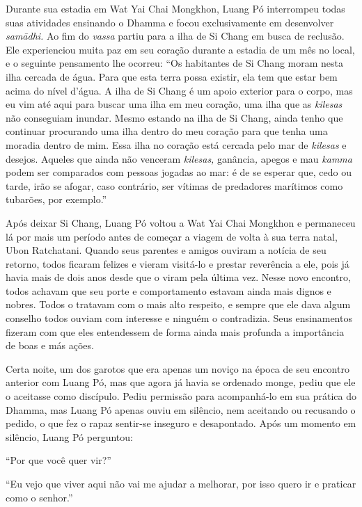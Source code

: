 Durante sua estadia em Wat Yai Chai Mongkhon, Luang Pó interrompeu todas
suas atividades ensinando o Dhamma e focou exclusivamente em desenvolver
\emph{samādhi.} Ao fim do \emph{vassa} partiu para a ilha de Si Chang em
busca de reclusão. Ele experienciou muita paz em seu coração durante a
estadia de um mês no local, e o seguinte pensamento lhe ocorreu: ``Os
habitantes de Si Chang moram nesta ilha cercada de água. Para que esta
terra possa existir, ela tem que estar bem acima do nível d'água. A ilha
de Si Chang é um apoio exterior para o corpo, mas eu vim até aqui para
buscar uma ilha em meu coração, uma ilha que as \emph{kilesas} não
conseguiam inundar. Mesmo estando na ilha de Si Chang, ainda tenho que
continuar procurando uma ilha dentro do meu coração para que tenha uma
moradia dentro de mim. Essa ilha no coração está cercada pelo mar de
\emph{kilesas} e desejos. Aqueles que ainda não venceram \emph{kilesas,}
ganância\emph{,} apegos e mau \emph{kamma} podem ser comparados com
pessoas jogadas ao mar: é de se esperar que, cedo ou tarde, irão se
afogar, caso contrário, ser vítimas de predadores marítimos como
tubarões, por exemplo.''

Após deixar Si Chang, Luang Pó voltou a Wat Yai Chai Mongkhon e
permaneceu lá por mais um período antes de começar a viagem de volta à
sua terra natal, Ubon Ratchatani. Quando seus parentes e amigos ouviram
a notícia de seu retorno, todos ficaram felizes e vieram visitá-lo e
prestar reverência a ele, pois já havia mais de dois anos desde que o
viram pela última vez. Nesse novo encontro, todos achavam que seu porte
e comportamento estavam ainda mais dignos e nobres. Todos o tratavam com
o mais alto respeito, e sempre que ele dava algum conselho todos ouviam
com interesse e ninguém o contradizia. Seus ensinamentos fizeram com que
eles entendessem de forma ainda mais profunda a importância de boas e
más ações.

Certa noite, um dos garotos que era apenas um noviço na época de seu
encontro anterior com Luang Pó, mas que agora já havia se ordenado
monge, pediu que ele o aceitasse como discípulo. Pediu permissão para
acompanhá-lo em sua prática do Dhamma, mas Luang Pó apenas ouviu em
silêncio, nem aceitando ou recusando o pedido, o que fez o rapaz
sentir-se inseguro e desapontado. Após um momento em silêncio, Luang Pó
perguntou:

``Por que você quer vir?''

``Eu vejo que viver aqui não vai me ajudar a melhorar, por isso quero ir
e praticar como o senhor.''

